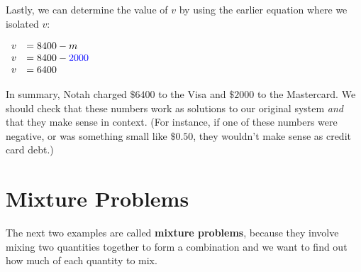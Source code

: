 \documentclass[nooutcomes]{ximera}
\begin{document}
\begin{example}
\begin{explanation}
          Lastly, we can determine the value of $v$ by using the earlier equation where we isolated $v$:
\begin{center}
$
  \begin{array}{rl}
            v&=8400-m\\
            v&=8400-{\color{blue}{{2000}}}\\
            v&=6400\\
\end{array}
$
\end{center}        
          In summary, Notah charged $\$6400$ to the Visa and $\$2000$ to the Mastercard.
          We should check that these numbers work as solutions to our original system \emph{and}
          that they make sense in context.
          (For instance, if one of these numbers were negative,
          or was something small like $\$0.50$,
          they wouldn't make sense as credit card debt.)
  \end{explanation}
\end{example}

\section{Mixture Problems}
      The next two examples are called
      \textbf{mixture problems},
      because they involve mixing two quantities together to form a combination and we want to find out how much of each quantity to mix.
 
\end{document}
